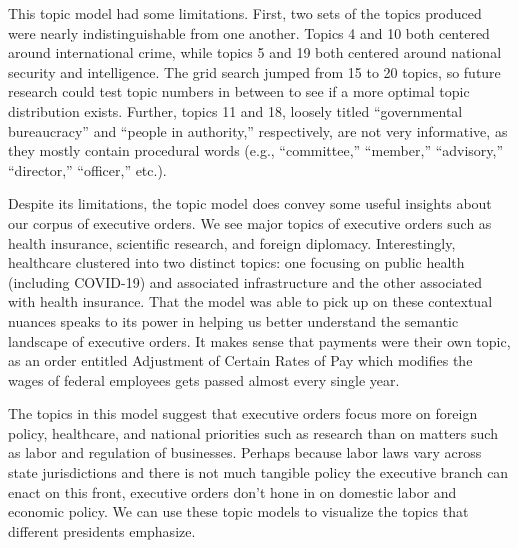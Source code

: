 \documentclass{article}
\begin{document}
{{This topic model had some limitations. First, two sets of the topics produced were nearly indistinguishable from one another. Topics 4 and 10 both centered around international crime, while topics 5 and 19 both centered around national security and intelligence. The grid search jumped from 15 to 20 topics, so future research could test topic numbers in between to see if a more optimal topic distribution exists. Further, topics 11 and 18, loosely titled “governmental bureaucracy” and “people in authority,” respectively, are not very informative, as they mostly contain procedural words (e.g., “committee,” “member,” “advisory,” “director,” “officer,” etc.). 

Despite its limitations, the topic model does convey some useful insights about our corpus of executive orders. We see major topics of executive orders such as health insurance, scientific research, and foreign diplomacy. Interestingly, healthcare clustered into two distinct topics: one focusing on public health (including COVID-19) and associated infrastructure and the other associated with health insurance. That the model was able to pick up on these contextual nuances speaks to its power in helping us better understand the semantic landscape of executive orders. It makes sense that payments were their own topic, as an order entitled Adjustment of Certain Rates of Pay which modifies the wages of federal employees gets passed almost every single year. 

The topics in this model suggest that executive orders focus more on foreign policy, healthcare, and national priorities such as research than on matters such as labor and regulation of businesses. Perhaps because labor laws vary across state jurisdictions and there is not much tangible policy the executive branch can enact on this front, executive orders don’t hone in on domestic labor and economic policy. We can use these topic models to visualize the topics that different presidents emphasize. 

}}
\end{document}
